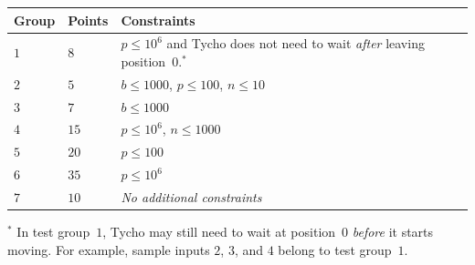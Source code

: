 \medskip
\begin{tabular}{lll}
Group & Points & Constraints \\\hline
  $1$ & $8$  & $p\leq 10^6$ and Tycho does not need to wait \emph{after} leaving position~$0$.$^*$ \\ %
  $2$ & $5$  & $b\leq 1000$, $p\leq 100$, $n\leq 10$ \\
  $3$ & $7$  & $b\leq 1000$ \\
  $4$ & $15$ & $p\leq 10^6$, $n\leq 1000$\\
  $5$ & $20$ & $p\leq 100$\\
  $6$ & $35$ & $p\leq 10^6$\\
  $7$ & $10$ & \emph{No additional constraints}
\end{tabular}

\medskip
\noindent $^*$ In test group~$1$, Tycho may still need to wait at position~$0$ \emph{before} it starts moving.
For example, sample inputs $2$, $3$, and $4$ belong to test group~$1$.
